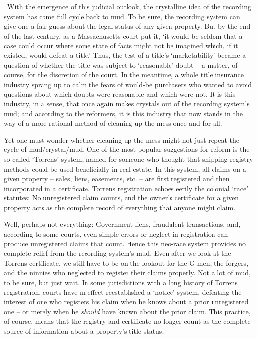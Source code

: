 ~With the emergence of this judicial outlook, the crystalline idea of the
recording system has come full cycle back to mud. To be sure, the recording
system can give one a fair guess about the legal status of any given property.
But by the end of the last century, as a Massachusetts court put it, `it would
be seldom that a case could occur where some state of facts might not be
imagined which, if it existed, would defeat a title.' Thus, the test of a
title's `marketability' became a question of whether the title was subject to
`reasonable' doubt -- a matter, of course, for the discretion of the court. In
the meantime, a whole title insurance industry sprang up to calm the fears of
would-be purchasers who wanted to avoid questions about which doubts were
reasonable and which were not. It is this industry, in a sense, that once again
makes crystals out of the recording system's mud; and according to the
reformers, it is this industry that now stands in the way of a more rational
method of cleaning up the mess once and for all. 

Yet one must wonder whether cleaning up the mess might not just repeat the cycle
of mud/crystal/mud. One of the most popular suggestions for reform is the
so-called `Torrens' system, named for someone who thought that shipping
registry methods could be used beneficially in real estate. In this system, all
claims on a given property -- sales, liens, easements, etc. -- are first
registered and then incorporated in a certificate. Torrens registration echoes
eerily the colonial `race' statutes: No unregistered claim counts, and the
owner's certificate for a given property acts as the complete record of
everything that anyone might claim.

Well, perhaps not everything: Government liens, fraudulent transactions, and,
according to some courts, even simple errors or neglect in registration can
produce unregistered claims that count. Hence this neo-race system provides no
complete relief from the recording system's mud. Even after we look at the
Torrens certificate, we still have to be on the lookout for the G-men, the
forgers, and the ninnies who neglected to register their claims properly. Not a
lot of mud, to be sure, but just wait. In some jurisdictions with a long
history of Torrens registration, courts have in effect reestablished a `notice'
system, defeating the interest of one who registers his claim when he knows
about a prior unregistered one -- or merely when he \textit{should} have known
about the prior claim. This practice, of course, means that the registry and
certificate no longer count as the complete source of information about a
property's title status.


